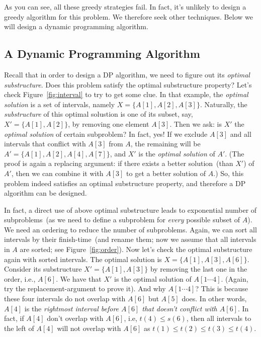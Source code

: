 As you can see, all these greedy strategies fail. In fact, it's unlikely to design a greedy algorithm for this problem.
We therefore seek other techniques. Below we will design a dynamic programming algorithm.

\subsection*{A Dynamic Programming Algorithm}

Recall that in order to design a DP algorithm, we need to figure out its \emph{optimal substructure}.
Does this problem satisfy the optimal substructure property?
Let's check Figure~\ref{fig:interval} to try to get some clue.
In that example, the \emph{optimal solution} is a set of intervals, namely $X = \{A[1], A[2], A[3]\}$.
Naturally, the \emph{substructure} of this optimal solustion is one of its subset, say, $X' = \{A[1], A[2]\}$, by removing one element $A[3]$.
Then we ask: is $X'$ the \emph{optimal solution} of certain subproblem?
In fact, yes! If we exclude $A[3]$ and all intervals that conflict with $A[3]$ from $A$,
the remaining will be $A' = \{A[1], A[2], A[4], A[7]\}$, and $X'$ is 
the \emph{optimal solution} of $A'$. (The proof is again a replacing argument: if there exists a
better solution~(than $X'$) of $A'$, then we can combine it with $A[3]$ to get a better solution of $A$.)
So, this problem indeed satisfies an optimal substructure property, and therefore a DP algorithm can be designed.

In fact, a direct use of above optimal substructure leads to exponential number of subproblems~(as we need to
define a subproblem for \emph{every} possible subset of $A$). We need an ordering to reduce
the number of subproblems.  Again, we can sort all intervals by their finish-time~(and rename them;
now we assume that all intervals in $A$ are sorted; see Figure~\ref{fig:order}).
Now let's check the optimal substructure again with sorted intervals.
The optimal solution is $X = \{A[1], A[3], A[6]\}$.
Consider its substructure $X' = \{A[1], A[3]\}$ by removing the last one in the order, i.e., $A[6]$.
We have that $X'$ is the optimal solution of $A[1\cdots 4]$. (Again, try the replacement-argument to prove it).
And why $A[1\cdots 4]$? This is because these four intervals do not overlap with $A[6]$ but $A[5]$ does.
In other words, $A[4]$ is the \emph{rightmost interval before $A[6]$ that doesn't conflict with $A[6]$}.
In fact, if $A[4]$ don't overlap with $A[6]$, i.e, $t(4)\le s(6)$, then all intervals to the left of $A[4]$ will not overlap with $A[6]$
as $t(1) \le t(2) \le t(3) \le t(4)$. 

